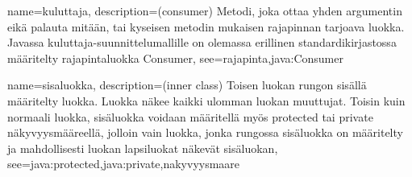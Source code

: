 {
	name=kuluttaja,
	description={(consumer) Metodi, joka ottaa yhden argumentin eikä palauta mitään, tai kyseisen
metodin mukaisen rajapinnan tarjoava luokka. Javassa kuluttaja-suunnittelumallille on olemassa
erillinen standardikirjastossa määritelty rajapintaluokka Consumer},
	see={rajapinta,java:Consumer}
}

{
	name=sisaluokka,
	description={(inner class) Toisen luokan rungon sisällä määritelty luokka. Luokka näkee
kaikki ulomman luokan muuttujat. Toisin kuin normaali luokka, sisäluokka voidaan määritellä myös
protected tai private näkyvyysmääreellä, jolloin vain luokka, jonka rungossa sisäluokka on
määritelty ja mahdollisesti luokan lapsiluokat näkevät sisäluokan},
	see={java:protected,java:private,nakyvyysmaare}
}